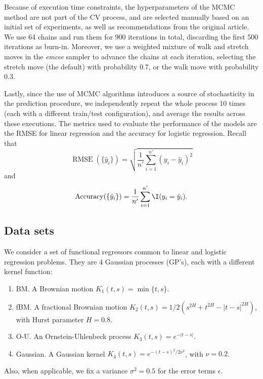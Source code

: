 Because of execution time constraints, the hyperparameters of the MCMC method are not part of the CV process, and are selected manually based on an initial set of experiments, as well as recommendations from the original article. We use 64 chains and run them for 900 iterations in total, discarding the first 500 iterations as burn-in. Moreover, we use a weighted mixture of walk and stretch moves in the \textit{emcee} sampler to advance the chains at each iteration, selecting the stretch move (the default) with probability \(0.7\), or the walk move with probability \(0.3\).

Lastly, since the use of MCMC algorithms introduces a source of stochasticity in the prediction procedure, we independently repeat the whole process 10 times (each with a different train/test configuration), and average the results across these executions. The metrics used to evaluate the performance of the models are the RMSE for linear regression and the accuracy for logistic regression. Recall that
\[
\operatorname{RMSE}(\{\hat y_i\}) = \sqrt{\frac{1}{n'}\sum_{i=1}^{n'} (y_i - \hat y_i)^2}
\]
and
\[
\operatorname{Accuracy}(\{\hat y_i\}) = \frac{1}{n'} \sum_{i=1}^{n'} \I(y_i = \hat y_i).
\]

\subsection*{Data sets}

We consider a set of functional regressors common to linear and logistic regression problems. They are 4 Gaussian processes (GP's), each with a different kernel function:
\begin{enumerate}
  \item BM.\hspace{0.3em} A Brownian motion \(K_1(t,s)=\min\{t,s\}\).
  \item fBM.\hspace{0.3em} A fractional Brownian motion \(K_2(t,s)=1/2(s^{2H} + t^{2H} - |t-s|^{2H})\), with Hurst parameter \(H=0.8\).
  \item O-U.\hspace{0.3em} An Ornstein-Uhlenbeck process \(K_3(t,s)=e^{-|t-s|}\).
  \item Gaussian.\hspace{0.3em} A Gaussian kernel \(K_4(t,s)=e^{-(t-s)^2/2\nu^2}\), with \(\nu=0.2\).
\end{enumerate}
Also, when applicable, we fix a variance \(\sigma^2=0.5\) for the error terms \(\epsilon\).

